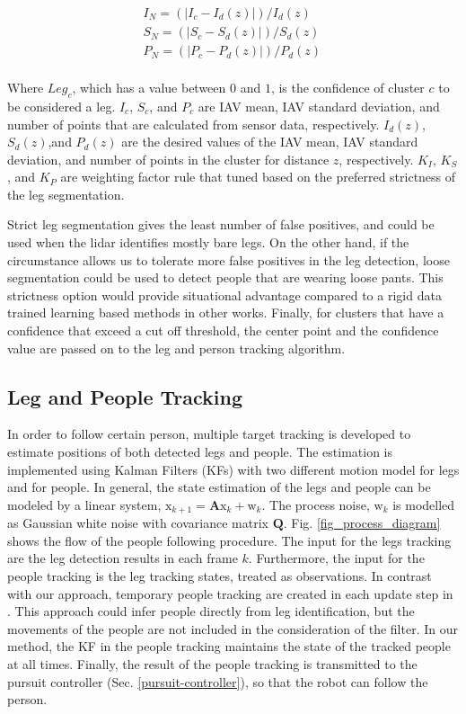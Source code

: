\documentclass[10 pt,a4paper,conference]{IEEEtran}
\begin{document}
\begin{align*}
I_N=(|I_c-I_d(z)|)/{I_d(z)}\, \\
S_N=(|S_c-S_d(z)|)/{S_d(z)}\, \\
P_N=(|P_c-P_d(z)|)/{P_d(z)}\, \\
\end{align*}

Where \(Leg_{c}\), which has a value between \(0\) and \(1\), is the
confidence of cluster \(c\) to be considered a leg. \(I_c\), \(S_c\),
and \(P_c\) are IAV mean, IAV standard deviation, and number of points
that are calculated from sensor data, respectively. \(I_d(z)\),
\(S_d(z)\),and \(P_d(z)\) are the desired values of the IAV mean, IAV
standard deviation, and number of points in the cluster for distance
\(z\), respectively. \(K_I\), \(K_S\), and \(K_P\) are weighting factor
rule that tuned based on the preferred strictness of the leg
segmentation.

Strict leg segmentation gives the least number of false positives, and
could be used when the lidar identifies mostly bare legs. On the other
hand, if the circumstance allows us to tolerate more false positives in
the leg detection, loose segmentation could be used to detect people
that are wearing loose pants. This strictness option would provide
situational advantage compared to a rigid data trained learning based
methods in other works. Finally, for clusters that have a confidence that exceed a cut off
threshold, the center point and the confidence value are passed on to
the leg and person tracking algorithm.

\subsection{Leg and People Tracking}\label{leg-and-people-tracking}

In order to follow certain person, multiple target tracking is developed
to estimate positions of both detected legs and people. The estimation
is implemented using Kalman Filters (KFs) \citep{KalmanRudolfEmil} with
two different motion model for legs and for people. In general, the
state estimation of the legs and people can be modeled by a linear
system,
\(\boldsymbol{\mathrm{x}}_{k+1}=\boldsymbol{A} \boldsymbol{\mathrm{x}}_k + \boldsymbol{\mathrm{w}}_k\).
The process noise, \(\boldsymbol{\mathrm{w}}_k\) is modelled as Gaussian
white noise with covariance matrix \(\boldsymbol{Q}\). Fig.
\ref{fig_process_diagram} shows the flow of the people following
procedure. The input for the legs tracking are the leg detection results
in each frame \(k\). Furthermore, the input for the people tracking is
the leg tracking states, treated as observations. In contrast with our
approach, temporary people tracking are created in each update step in
\citep{ref7}. This approach could infer people directly from leg
identification, but the movements of the people are not included in the
consideration of the filter. In our method, the KF in the people
tracking maintains the state of the tracked people at all times.
Finally, the result of the people tracking is transmitted to the pursuit
controller (Sec. \ref{pursuit-controller}), so that the robot can follow
the person.
\end{document}
